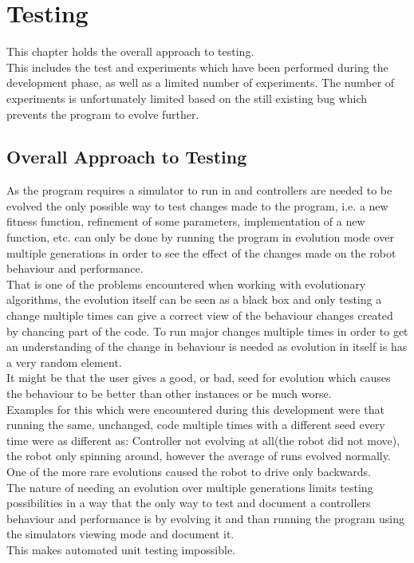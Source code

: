 \chapter{Testing}
This chapter holds the overall approach to testing. \\
This includes the test and experiments which have been performed during the development phase, as well as a limited number of experiments. 
The number of experiments is unfortunately limited based on the still existing bug which prevents the program to evolve further. \\

\section{Overall Approach to Testing}
As the program requires a simulator to run in and controllers are needed to be evolved the only possible way to test changes made to the program, i.e. a new fitness function, refinement of some parameters, implementation of a new function, etc. can only be done by running the program in evolution mode over multiple generations in order to see the effect of the changes made on the robot behaviour and performance.\\
That is one of the problems encountered when working with evolutionary algorithms, the evolution itself can be seen as a black box and only testing a change multiple times can give a correct view of the behaviour changes created by chancing part of the code. To run major changes multiple times in order to get an understanding of the change in behaviour is needed as evolution in itself is has a very random element.\\
It might be that the user gives a good, or bad, seed for evolution which causes the behaviour to be better than other instances or be much worse. \\
Examples for this which were encountered during this development were that running the same, unchanged, code multiple times with a different seed every time were as different as: Controller not evolving at all(the robot did not move), the robot only spinning around, however the average of runs evolved normally. \\
One of the more rare evolutions caused the robot to drive only backwards. \\

The nature of needing an evolution over multiple generations limits testing possibilities in a way that the only way to test and document a controllers behaviour and performance is by evolving it and than running the program using the simulators viewing mode and document it. \\
This makes automated unit testing impossible.\\

